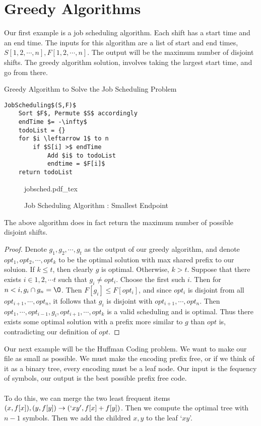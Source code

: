 \documentclass{article}
\newcommand{\incfig}[1]{%
    \def\svgwidth{.5\linewidth}
    {#1.pdf_tex}
}
\theoremstyle{definition}
\begin{document}
\section{Greedy Algorithms}
    Our first example is a job scheduling algorithm. Each shift has a start time and an end time.
    The inputs for this algorithm are a list of start and end times, $S[1,2,\cdots,n], F[1,2,\cdots,n]$.
    The output will be the maximum number of disjoint shifts. The greedy algorithm solution, involves taking
    the largest start time, and go from there.
    \begin{mdframed}
        Greedy Algorithm to Solve the Job Scheduling Problem
        \begin{lstlisting}[mathescape=true]
JobScheduling$(S,F)$
    Sort $F$, Permute $S$ accordingly
    endTime $= -\infty$
    todoList = {}
    for $i \leftarrow 1$ to n
        if $S[i] >$ endTime
            Add $i$ to todoList
            endtime = $F[i]$
    return todoList
        \end{lstlisting}
    \end{mdframed}
    \begin{figure}[ht]
        \centering
        \incfig{jobsched}
        \caption{Job Scheduling Algorithm : Smallest Endpoint}
        \label{fig:jobsched}
    \end{figure}
    The above algorithm does in fact return the maximum number of possible disjoint shifts.
    \begin{proof}
        Denote $g_1,g_2,\cdots,g_t$ as the output of our greedy algorithm, and denote $opt_1,opt_2,\cdots,opt_k$
        to be the optimal solution with max shared prefix to our soluion.
        If $k \leqslant t$, then clearly $g$ is optimal. Otherwise, $k > t$.
        Suppose that there exists $i \in 1,2,\cdots t$ such that $g_i \neq opt_i$. Choose the first such $i$.
        Then for $n < i, g_i \cap g_n = \O$. Then $F[g_i] \leqslant F[opt_i]$, and since $opt_i$ is disjoint from
        all $opt_{i+1},\cdots,opt_n$, it follows that  $g_i$ is disjoint with $opt_{i+1},\cdots,opt_n$.
        Then $opt_1,\cdots, opt_{i-1},g_i,opt_{i+1},\cdots,opt_k$ is a valid scheduling and is optimal.
        Thus there exists some optimal solution with a prefix more similar to $g$ than $opt$ is, contradicting our 
        definition of $opt$.
    \end{proof}
    Our next example will be the Huffman Coding problem. We want to make our file as small as possible. We must make 
    the encoding prefix free, or if we think of it as a binary tree, every encoding must be a leaf node.
    Our input is the fequency of symbols, our output is the best possible prefix free code.\\\\
    To do this, we can merge the two least frequent items $(x,f[x]),(y,f[y]) \rightarrow(`xy', f[x] + f[y])$. Then we
    compute the optimal tree with $n-1$ symbols. Then we add the childred $x,y$ to the leaf `$xy$'.
    
\end{document}
